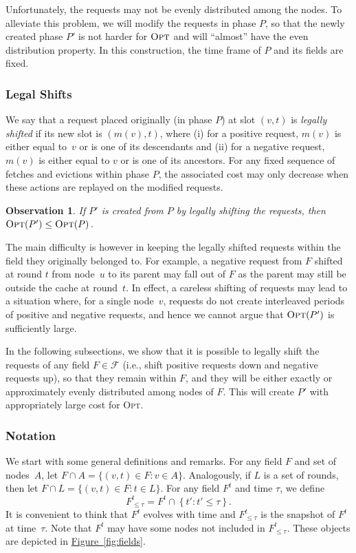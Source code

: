 \documentclass[sigconf,screen=true]{acmart}
\newtheorem{observation}[theorem]{Observation}
\newcommand{\lref}[2][]{\hyperref[#2]{#1~\ref*{#2}}}
\newcommand{\OPT}{\textsc{Opt}\xspace}
\newcommand{\F}{\mathcal{F}}
\begin{document}
Unfortunately, the requests may not be evenly distributed among the nodes. To
alleviate this problem, we will modify the requests in phase $P$, so that the
newly created phase $P'$ is not harder for $\OPT$ and will ``almost'' have the
even distribution property. In this construction, the time frame of $P$ and
its fields are fixed.

\subsubsection{Legal Shifts}

We say that a request placed originally (in phase $P$) at slot $(v,t)$ is
\emph{legally shifted} if its new slot is $(m(v), t)$, where (i) for a
positive request, $m(v)$ is either equal to~$v$ or is one of its descendants
and (ii) for a negative request, $m(v)$ is either equal to $v$ or is one of
its ancestors. For any fixed sequence of fetches and evictions within phase
$P$, the associated cost may only decrease when these actions are replayed on
the modified requests.

\begin{observation}
\label{obs:pprim_easier_than_p}
If $P'$ is created from $P$ by legally shifting the requests, then $\OPT(P')
\leq \OPT(P)$.
\end{observation}

The main difficulty is however in keeping the legally shifted requests within
the field they originally belonged to. For example, a negative request from
$F$ shifted at round $t$ from node~$u$ to its parent may fall out of $F$ as
the parent may still be outside the cache at round~$t$. In effect, a careless
shifting of requests may lead to a situation where, for a single node~$v$,
requests do not create interleaved periods of positive and negative requests,
and hence we cannot argue that $\OPT(P')$ is sufficiently large.

In the following subsections, we show that it is possible to legally shift the
requests of any field $F \in \F$ (i.e., shift positive requests down and negative
requests up), so that they remain within $F$, and they will
be either exactly or approximately evenly distributed among nodes of $F$.
This will create $P'$ with appropriately large cost for \OPT.


\subsubsection{Notation}
%
We start with some general definitions and remarks. For any field $F$ and set
of nodes~$A$, let $F \cap A = \{ (v,t) \in F : v \in A \}$. Analogously, if
$L$ is a set of rounds, then let $F \cap L = \{ (v,t) \in F : t \in L \}$. For
any field $F^t$ and time $\tau$, we define
\[
    F^t_{\leq \tau} = F^t \cap \left\{ t' : t' \leq \tau \right\}.
\]
It is convenient to think that $F^t$ evolves with time and $F^t_{\leq \tau}$
is the snapshot of $F^t$ at time~$\tau$. Note that $F^t$ may have some nodes
not included in $F^t_{\leq \tau}$. These objects are depicted in
\lref[Figure]{fig:fields}.
\end{document}
